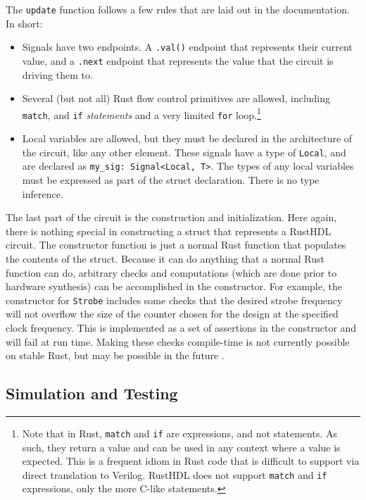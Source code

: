\documentclass[conference]{IEEEtran}
\begin{document}
The \verb|update| function follows a few rules that are laid out in the documentation.  In short:
\begin{itemize}
  \item Signals have two endpoints.  A \verb|.val()| endpoint that represents their current value, and a \verb|.next| 
    endpoint that represents the value that the circuit is driving them to.
  \item Several (but not all) Rust flow control primitives are allowed, including \verb|match|, and  \verb|if| \emph{statements} 
  and a very limited \verb|for| loop.\footnote{Note that in Rust, \verb|match| and \verb|if| are expressions, and not statements. As 
  such, they return a value and can be used in any context where a value is expected.  This is a frequent idiom in Rust code that
  is difficult to support via direct translation to Verilog.  RustHDL does not support \verb|match| and \verb|if| expressions, 
  only the more C-like statements.}  
  \item Local variables are allowed, but they must be declared in the architecture of the circuit, like any other element.
  These signals have a type of \verb|Local|, and are declared as \verb|my_sig: Signal<Local, T>|.  The types of any local 
  variables must be expressed as part of the struct declaration.  There is no type inference.
\end{itemize}

The last part of the circuit is the construction and initialization.  Here again, there is nothing special in constructing 
a struct that represents a RustHDL circuit.  The 
constructor function is just a normal Rust function that populates the contents of the struct.  Because it can do anything
that a normal Rust function can do, arbitrary checks and computations (which are done prior to hardware synthesis) can be 
accomplished in the constructor.  For example, the constructor for \verb|Strobe| includes some checks that the 
desired strobe frequency will not overflow the size of the counter chosen for the design at the specified clock frequency.  
This is implemented as a set  of assertions in the constructor and will fail at run time.  Making these checks 
compile-time is not currently possible on stable Rust, but may be possible in the future \cite{b11}.

\subsection{Simulation and Testing}
\end{document}
